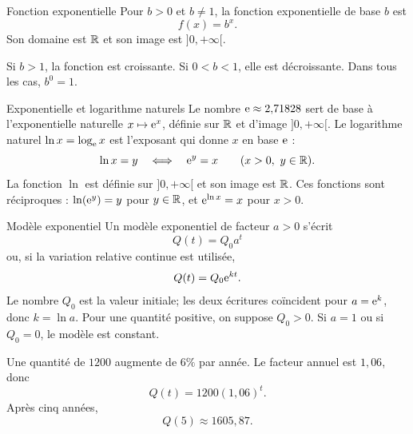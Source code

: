 \begin{definition}{Fonction exponentielle}{}
Pour $b>0$ et $b\neq1$, la fonction exponentielle de base $b$ est
\[
f(x)=b^x.
\]
Son domaine est $\mathbb{R}$ et son image est $]0,+\infty[$.
\end{definition}

Si $b>1$, la fonction est croissante. Si $0<b<1$, elle est décroissante. Dans tous les cas, $b^0=1$.

\begin{center}
\end{center}

\begin{definition}{Exponentielle et logarithme naturels}{}
Le nombre $\mathrm{e}\approx2{,}71828$ sert de base à l'exponentielle naturelle $x\mapsto\mathrm{e}^x$, définie sur $\mathbb{R}$ et d'image $]0,+\infty[$. Le logarithme naturel $\ln x=\log_{\mathrm{e}}x$ est l'exposant qui donne $x$ en base $\mathrm{e}$ :
\[
\ln x=y\quad\Longleftrightarrow\quad\mathrm{e}^y=x
\qquad(x>0,\ y\in\mathbb{R}).
\]
La fonction $\ln$ est définie sur $]0,+\infty[$ et son image est $\mathbb{R}$. Ces fonctions sont réciproques : $\ln(\mathrm{e}^y)=y$ pour $y\in\mathbb{R}$, et $\mathrm{e}^{\ln x}=x$ pour $x>0$.
\end{definition}

\begin{definition}{Modèle exponentiel}{}
Un modèle exponentiel de facteur $a>0$ s'écrit
\[
Q(t)=Q_0a^t
\]
ou, si la variation relative continue est utilisée,
\[
Q(t)=Q_0\mathrm{e}^{kt}.
\]
Le nombre $Q_0$ est la valeur initiale; les deux écritures coïncident pour $a=\mathrm{e}^k$, donc $k=\ln a$. Pour une quantité positive, on suppose $Q_0>0$. Si $a=1$ ou si $Q_0=0$, le modèle est constant.
\end{definition}

\begin{examplebox}
Une quantité de $1200$ augmente de $6\%$ par année. Le facteur annuel est $1{,}06$, donc
\[
Q(t)=1200(1{,}06)^t.
\]
Après cinq années,
\[
Q(5)\approx1605{,}87.
\]
\end{examplebox}

